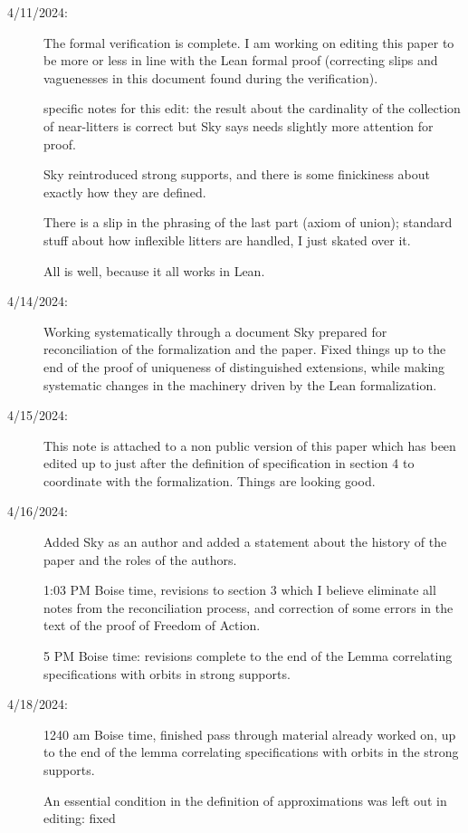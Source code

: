 \documentclass[112pt]{article}
\begin{document}
\begin{description}
\item[4/11/2024:]  The formal verification is complete.  I am working on editing this paper to be more or less in line with the Lean formal proof (correcting slips and vaguenesses in this document found during the verification).

specific notes for this edit:  the result about the cardinality of the collection of near-litters is correct but Sky says needs slightly more attention for proof.  

Sky reintroduced strong supports, and there is some finickiness about exactly how they are defined.

There is a slip in the phrasing of the last part (axiom of union);  standard stuff about how inflexible litters are handled, I just skated over it.

All is well, because it all works in Lean.

\item[4/14/2024:]  Working systematically through a document Sky prepared for reconciliation of the formalization and the paper.  Fixed things up to the end of the proof of uniqueness of distinguished extensions, while making systematic changes in the machinery driven by the Lean formalization.

\item[4/15/2024:]  This note is attached to a non public version of this paper which has been edited up to just after the definition of specification in section 4 to coordinate with the formalization.  Things are looking good.

\item[4/16/2024:]  Added Sky as an author and added a statement about the history of the paper and the roles of the authors.

1:03 PM Boise time, revisions to section 3 which I believe eliminate all notes from the reconciliation process, and correction of some errors in the text of the proof of Freedom of Action.

5 PM Boise time:  revisions complete to the end of the Lemma correlating specifications with orbits in strong supports.


\item[4/18/2024:]  1240 am Boise time, finished pass through material already worked on, up to the end of the lemma
correlating specifications with orbits in the strong supports.

An essential condition in the definition of approximations was left out in editing:  fixed


\end{description}
\end{document}
